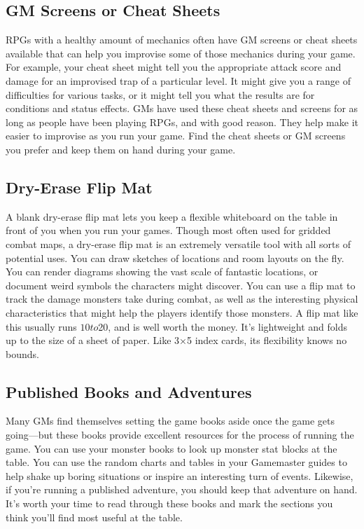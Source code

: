 \documentclass[10pt,a4paper,twoside,bg=print,twocolumn,openany,nodeprecatedcode]{dndbook}
\begin{document}
\subsection{GM Screens or Cheat Sheets}
RPGs with a healthy amount of mechanics often have GM screens or cheat sheets available that can help you improvise some of those mechanics during your game. For example, your cheat sheet might tell you the appropriate attack score and damage for an improvised trap of a particular level. It might give you a range of difficulties for various tasks, or it might tell you what the results are for conditions and status effects. GMs have used these cheat sheets and screens for as long as people have been playing RPGs, and with good reason. They help make it easier to improvise as you run your game. Find the cheat sheets or GM screens you prefer and keep them on hand during your game.
\subsection{Dry-Erase Flip Mat}
A blank dry-erase flip mat lets you keep a flexible whiteboard on the table in front of you when you run your games. Though most often used for gridded combat maps, a dry-erase flip mat is an extremely versatile tool with all sorts of potential uses. You can draw sketches of locations and room layouts on the fly. You can render diagrams showing the vast scale of fantastic locations, or document weird symbols the characters might discover. You can use a flip mat to track the damage monsters take during combat, as well as the interesting physical characteristics that might help the players identify those monsters.
A flip mat like this usually runs $10 to $20, and is well worth the money. It's lightweight and folds up to the size of a sheet of paper. Like 3×5 index cards, its flexibility knows no bounds.
\subsection{Published Books and Adventures}
Many GMs find themselves setting the game books aside once the game gets going—but these books provide excellent resources for the process of running the game. You can use your monster books to look up monster stat blocks at the table. You can use the random charts and tables in your Gamemaster guides to help shake up boring situations or inspire an interesting turn of events. Likewise, if you're running a published adventure, you should keep that adventure on hand. It's worth your time to read through these books and mark the sections you think you'll find most useful at the table.
\end{document}
